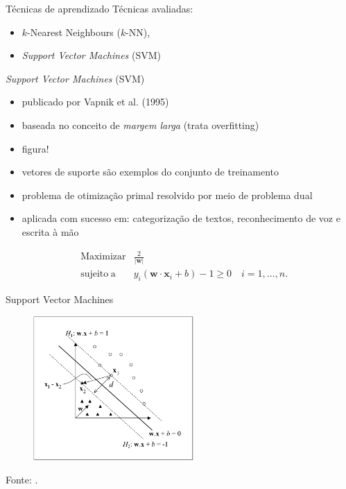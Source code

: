 \documentclass{beamer}
\newcommand{\vect}[1]{\mathbf{#1}}
\newcommand{\norma}[1]{| #1 |}
\begin{document}
\begin{frame}{Técnicas de aprendizado}
Técnicas avaliadas:
\begin{itemize}
\item $k$-Nearest Neighbours ($k$-NN),
\item \emph{Support Vector Machines} (SVM)
\end{itemize}
\end{frame}

\begin{frame}{\emph{Support Vector Machines} (SVM)}
\begin{itemize}
  \item publicado por Vapnik et al. (1995)\nocite{vapnik1998statistical}
  \item baseada no conceito de \emph{margem larga} (trata overfitting)
  \item figura!
  \item vetores de suporte são exemplos do conjunto de treinamento
  \item problema de otimiza\c{c}ão primal resolvido por meio de problema
dual
  \item aplicada com sucesso em: categorização de textos, reconhecimento de
voz e escrita à mão\cite{bennett2000support}
\end{itemize}

\begin{eqnarray}
& \label{eq:max_w0}\operatorname{Maximizar} & \frac{2}{\norma{\vect{w}}} \\
& \label{eq:max_w1} \operatorname{sujeito\;a} & y_i(\vect{w}\cdot\vect{x}_i + b) - 1 \ge 0 \quad i = 1,\dotsc,n.
\end{eqnarray}

\end{frame}

\begin{frame}{Support Vector Machines}
\begin{figure}
\centering
\includegraphics[height=5.5cm]{img/fig-hiperplanos.png}
\end{figure}
\tiny{Fonte: \cite{lorena2003introducaoas}.}
\end{frame}
\end{document}
